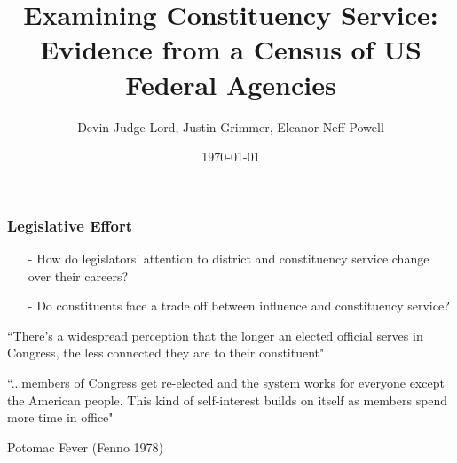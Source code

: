 \documentclass[xcolor=dvipsnames]{beamer}
\title[Examining Constituency Service]{\Large Examining Constituency Service: Evidence from a Census of US Federal Agencies}
\author[Judge-Lord, Grimmer, Powell]{\large Devin Judge-Lord, Justin Grimmer, Eleanor Neff Powell}
\institute[]{\normalsize University of Wisconsin,  Stanford University, University of Wisconsin}
\date{\today}
\begin{document}
            
            \frame{\titlepage}
            
            
            \begin{frame}
            \frametitle{Legislative Effort}
            
            \large
            
            \begin{itemize}
            \item[-] How do legislators' attention to district and constituency service change over their careers?  
            \item[-] Do constituents face a trade off between influence and constituency service?
            \end{itemize} 
            
            
            
            \end{frame}
            
            
            
            \begin{frame}
            
            
            
            ``There's a widespread perception that the longer an elected official serves in Congress, the less connected they are to their constituent"
            
            
            \end{frame}
            
            
            \begin{frame}
            
            
            
            ``...members of Congress get re-elected and the system works for everyone except the American people.  This kind of self-interest builds on itself as members spend more time in office"
            
            
            \end{frame}
            
            
            \begin{frame}
            
            
            
            Potomac Fever (Fenno 1978) 
            
            \end{frame}
            
\end{document}
